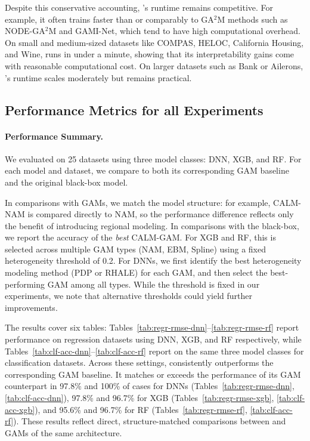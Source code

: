 Despite this conservative accounting, \method{}'s runtime remains competitive. For example, it often trains faster than or comparably to GA$^2$M methods such as NODE-GA$^2$M and GAMI-Net, which tend to have high computational overhead. On small and medium-sized datasets like COMPAS, HELOC, California Housing, and Wine, \method{} runs in under a minute, showing that its interpretability gains come with reasonable computational cost. On larger datasets such as Bank or Ailerons, \method{}’s runtime scales moderately but remains practical.

\subsection{Performance Metrics for all Experiments }
\paragraph{Performance Summary.}
We evaluated \method{} on 25 datasets using three model classes: DNN, XGB, and RF. For each model and dataset, we compare \method{} to both its corresponding GAM baseline and the original black-box model.

In comparisons with GAMs, we match the model structure: for example, CALM-NAM is compared directly to NAM, so the performance difference reflects only the benefit of introducing regional modeling. In comparisons with the black-box, we report the accuracy of the \emph{best} CALM-GAM. For XGB and RF, this is selected across multiple GAM types (NAM, EBM, Spline) using a fixed heterogeneity threshold of 0.2. For DNNs, we first identify the best heterogeneity modeling method (PDP or RHALE) for each GAM, and then select the best-performing GAM among all types. While the threshold is fixed in our experiments, we note that alternative thresholds could yield further improvements. 

The results cover six tables: Tables~\ref{tab:regr-rmse-dnn}–\ref{tab:regr-rmse-rf} report performance on regression datasets using DNN, XGB, and RF respectively, while Tables~\ref{tab:clf-acc-dnn}–\ref{tab:clf-acc-rf} report on the same three model classes for classification datasets. Across these settings, \method{} consistently outperforms the corresponding GAM baseline. It matches or exceeds the performance of its GAM counterpart in 97.8\% and 100\% of cases for DNNs (Tables~\ref{tab:regr-rmse-dnn}, \ref{tab:clf-acc-dnn}), 97.8\% and 96.7\% for XGB (Tables~\ref{tab:regr-rmse-xgb}, \ref{tab:clf-acc-xgb}), and 95.6\% and 96.7\% for RF (Tables~\ref{tab:regr-rmse-rf}, \ref{tab:clf-acc-rf}). These results reflect direct, structure-matched comparisons between \method{} and GAMs of the same architecture.


